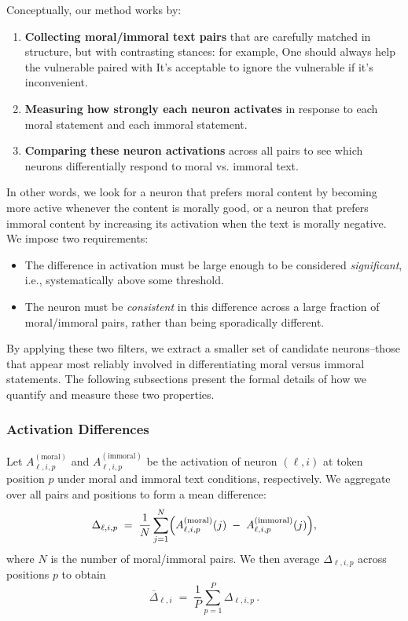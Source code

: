 \documentclass[runninghheads]{llncs}
\begin{document}
Conceptually, our method works by:
\begin{enumerate}
    \item \textbf{Collecting moral/immoral text pairs} that are carefully matched in structure, but with contrasting stances: for example, One should always help the vulnerable paired with It’s acceptable to ignore the vulnerable if it’s inconvenient.
    \item \textbf{Measuring how strongly each neuron activates} in response to each moral statement and each immoral statement.
    \item \textbf{Comparing these neuron activations} across all pairs to see which neurons differentially respond to moral vs. immoral text.
\end{enumerate}

In other words, we look for a neuron that prefers moral content by becoming more active whenever the content is morally good, or a neuron that prefers immoral content by increasing its activation when the text is morally negative. We impose two requirements:

\begin{itemize}
    \item The difference in activation must be large enough to be considered \textit{significant}, i.e., systematically above some threshold.
    \item The neuron must be \textit{consistent} in this difference across a large fraction of moral/immoral pairs, rather than being sporadically different.
\end{itemize}

By applying these two filters, we extract a smaller set of candidate neurons--those that appear most reliably involved in differentiating moral versus immoral statements. The following subsections present the formal details of how we quantify and measure these two properties.

\subsubsection{Activation Differences}  

Let \(A^{(\mathrm{moral})}_{\ell, i, p}\) and \(A^{(\mathrm{immoral})}_{\ell, i, p}\) be the activation of neuron \((\ell, i)\) at token position \(p\) under moral and immoral text conditions, respectively. We aggregate over all pairs and positions to form a mean difference:
\[
\Delta_{\ell,i, p} \;=\; \frac{1}{N} \sum_{j=1}^{N}\Bigl(A^{(\mathrm{moral})}_{\ell, i, p}(j) \;-\; A^{(\mathrm{immoral})}_{\ell, i, p}(j)\Bigr),
\]
where \(N\) is the number of moral/immoral pairs. We then average \(\Delta_{\ell, i, p}\) across positions \(p\) to obtain
\[
\overline{\Delta}_{\ell, i} \;=\; \frac{1}{P} \sum_{p=1}^{P}\Delta_{\ell, i, p}\,.
\]
\end{document}
